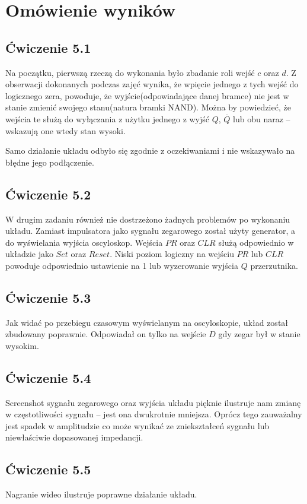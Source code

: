 \documentclass{article}
\begin{document}
  \section{Omówienie wyników}
    \subsection{Ćwiczenie 5.1}
      Na początku, pierwszą rzeczą do wykonania było zbadanie roli wejść $c$ oraz $d$. Z obserwacji dokonanych podczas zajęć wynika, że wpięcie jednego z tych wejść do logicznego zera, powoduje, że wyjście(odpowiadające danej bramce) nie jest w stanie zmienić swojego stanu(natura bramki NAND). Można by powiedzieć, że wejścia te służą do wyłączania z użytku jednego z wyjść $Q$, $\overline{Q}$ lub obu naraz -- wskazują one wtedy stan wysoki.

      Samo działanie układu odbyło się zgodnie z oczekiwaniami i nie wskazywało na błędne jego podłączenie.

    \subsection{Ćwiczenie 5.2}
      W drugim zadaniu również nie dostrzeżono żadnych problemów po wykonaniu układu. Zamiast impulsatora jako sygnału zegarowego został użyty generator, a do wyświelania wyjścia oscyloskop. Wejścia $PR$ oraz $CLR$ służą odpowiednio w układzie jako $Set$ oraz $Reset$. Niski poziom logiczny na wejściu $PR$ lub $CLR$ powoduje odpowiednio ustawienie na 1 lub wyzerowanie wyjścia $Q$ przerzutnika.
      
    \subsection{Ćwiczenie 5.3}
      Jak widać po przebiegu czasowym wyświelanym na oscyloskopie, układ został zbudowany poprawnie. Odpowiadał on tylko na wejście $D$ gdy zegar był w stanie wysokim.
    \subsection{Ćwiczenie 5.4}
      Screenshot sygnału zegarowego oraz wyjścia układu pięknie ilustruje nam zmianę w częstotliwości sygnału -- jest ona dwukrotnie mniejsza. Oprócz tego zauważalny jest spadek w amplitudzie co może wynikać ze zniekształceń sygnału lub niewłaściwie dopasowanej impedancji.
    \subsection{Ćwiczenie 5.5}
      Nagranie wideo ilustruje poprawne działanie układu.
\end{document}
